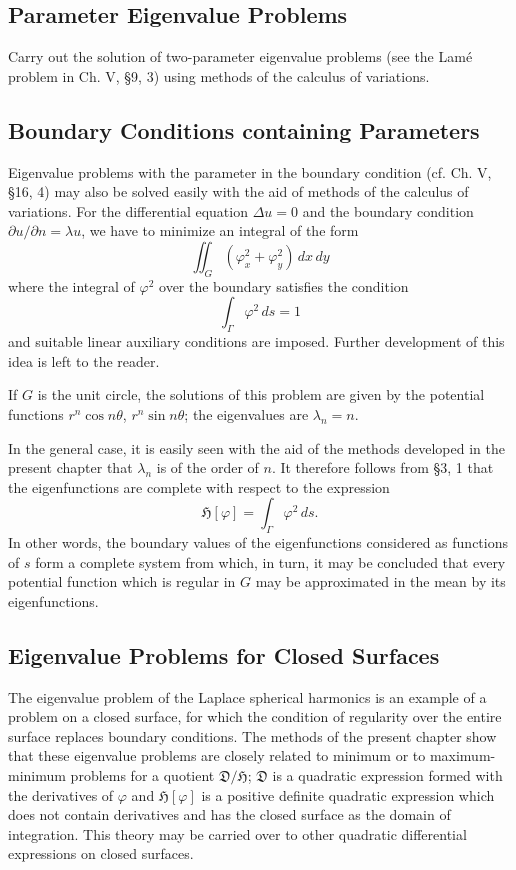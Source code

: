 \subsection{Parameter Eigenvalue Problems}
Carry out the solution of two-parameter eigenvalue problems (see the Lamé problem in Ch. V, \S9, 3) using methods of the calculus of variations.

\subsection{Boundary Conditions containing Parameters}
Eigenvalue problems with the parameter in the boundary condition (cf. Ch. V, \S16, 4) may also be solved easily with the aid of methods of the calculus of variations. For the differential equation $\Delta u=0$ and the boundary condition $\partial u/\partial n=\lambda u$, we have to minimize an integral of the form
\[
\iint_G(\varphi_x^2+\varphi_y^2)\,dx\,dy
\]
where the integral of $\varphi^2$ over the boundary satisfies the condition
\[
\int_\Gamma\varphi^2\,ds=1
\]
and suitable linear auxiliary conditions are imposed. Further development of this idea is left to the reader.

If $G$ is the unit circle, the solutions of this problem are given by the potential functions $r^n\cos n\theta$, $r^n\sin n\theta$; the eigenvalues are $\lambda_n=n$.

In the general case, it is easily seen with the aid of the methods developed in the present chapter that $\lambda_n$ is of the order of $n$. It therefore follows from \S3, 1 that the eigenfunctions are complete with respect to the expression
\[
\mathfrak H[\varphi]=\int_\Gamma\varphi^2\,ds.
\]
In other words, the boundary values of the eigenfunctions considered as functions of $s$ form a complete system from which, in turn, it may be concluded that every potential function which is regular in $G$ may be approximated in the mean by its eigenfunctions.

\subsection{Eigenvalue Problems for Closed Surfaces}
The eigenvalue problem of the Laplace spherical harmonics is an example of a problem on a closed surface, for which the condition of regularity over the entire surface replaces boundary conditions. The methods of the present chapter show that these eigenvalue problems are closely related to minimum or to maximum-minimum problems for a quotient $\mathfrak D/\mathfrak H$; $\mathfrak D$ is a quadratic expression formed with the derivatives of $\varphi$ and $\mathfrak H[\varphi]$ is a positive definite quadratic expression which does not contain derivatives and has the closed surface as the domain of integration. This theory may be carried over to other quadratic differential expressions on closed surfaces.

